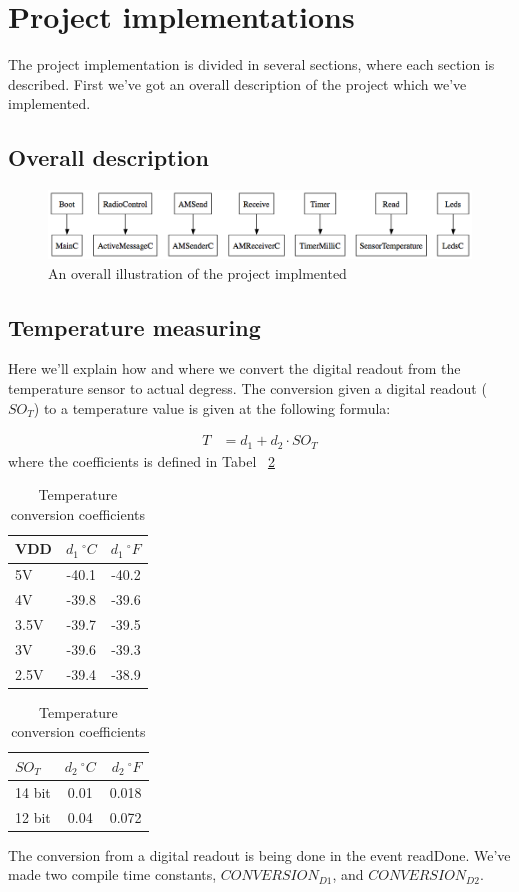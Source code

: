 \section{Project implementations}

The project implementation is divided in several sections, where each section
is described. First we've got an overall description of the project which we've
implemented.

\subsection{Overall description}
\begin{figure}[htbp]
   \centering
   \includegraphics[width=17cm]{SWgraph.png} 
   \caption{An overall illustration of the project implmented}
   \label{fig:overalloverview}
\end{figure}

\subsection{Temperature measuring}
Here we'll explain how and where we convert the digital readout from the
temperature sensor to actual degress. The conversion given a digital readout
($SO_{T}$) to a temperature value is given at the following
formula\cite{temperature}:

\begin{align*}
	T &= d_{1} + d_{2} \cdot SO_{T}
\end{align*}
where the coefficients is defined in Tabel ~\ref{table:temperature}
\begin{table}[ht]
\centering
\begin{tabular}{ | l | c | r | }
	\hline
	VDD & $d_{1} \ ^{\circ}  C$ & $d_{1} \ ^{\circ}  F$ \\
	\hline \hline
	5V & -40.1 & -40.2 \\
	\hline
	4V & -39.8 & -39.6 \\
	\hline
	3.5V & -39.7 & -39.5 \\
	\hline
	3V & -39.6 & -39.3 \\
	\hline
	2.5V & -39.4 & -38.9 \\
	\hline
\end{tabular}
\begin{tabular}{ | l | c | r | }
	\hline
	$SO_{T}$ & $d_{2}  \ ^{\circ}C$ & $d_{2} \ ^{\circ} F$ \\
	\hline \hline
	14 bit & 0.01 & 0.018 \\
	\hline
	12 bit & 0.04 & 0.072\\
	\hline
\end{tabular}
\caption{Temperature conversion coefficients}
\label{table:temperature}
\end{table}
The conversion from a digital readout is being done in the event readDone.
We've made two compile time constants, $CONVERSION_{D1}$, and
$CONVERSION_{D2}$.

